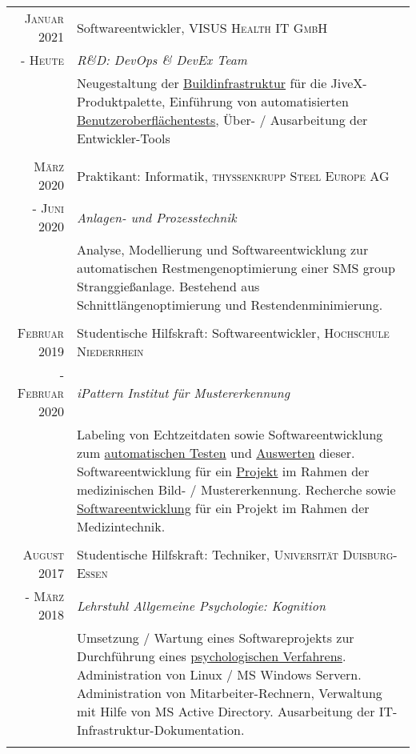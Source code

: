 \documentclass[10pt,a4paper]{article}
\begin{document}
\begin{tabular}{r|p{11cm}}
	\textsc{Januar} 2021 & Softwareentwickler, \textsc{VISUS Health IT GmbH} \\
	- \textsc{Heute} & \emph{R\&D: DevOps \& DevEx Team} \\
	& \footnotesize{Neugestaltung der \href{https://gradle.org}{Buildinfrastruktur} für die JiveX-Produktpalette, Einf\"uhrung von automatisierten \href{https://www.qfs.de}{Benutzeroberfl\"achentests}, \"Uber- / Ausarbeitung der Entwickler-Tools} \\
	\multicolumn{2}{c}{} \\
	
	\textsc{M\"arz} 2020 & Praktikant: Informatik, \textsc{thyssenkrupp Steel Europe AG} \\
	- \textsc{Juni} 2020 & \emph{Anlagen- und Prozesstechnik} \\
	& \footnotesize{Analyse, Modellierung und Softwareentwicklung zur automatischen Restmengenoptimierung einer SMS group Stranggie\ss anlage. Bestehend aus Schnittl\"angenoptimierung und Restendenminimierung.} \\
	\multicolumn{2}{c}{} \\

 	\textsc{Februar} 2019	& Studentische Hilfskraft: Softwareentwickler, \textsc{Hochschule Niederrhein} \\
	- \textsc{Februar} 2020	& \emph{iPattern Institut f\"ur Mustererkennung} \\
	& \footnotesize{Labeling von Echtzeitdaten sowie Softwareentwicklung zum \href{https://github.com/thahnen/labelbox-export-minifier}{automatischen Testen} und \href{https://github.com/thahnen/labelbox-scripts-etc}{Auswerten} dieser. Softwareentwicklung f\"ur ein \href{https://www.hs-niederrhein.de/ipattern/nachrichten-detailseite/?tx_news_pi1\%5Bnews\%5D=9545\&cHash=3202e26ca1ce23d3b3231df1f5c5a573}{Projekt} im Rahmen der medizinischen Bild- / Mustererkennung. Recherche sowie \href{https://github.com/thahnen/elastix-scripts-etc}{Softwareentwicklung} f\"ur ein Projekt im Rahmen der Medizintechnik.} \\
	\multicolumn{2}{c}{} \\
	
	 \textsc{August} 2017	& Studentische Hilfskraft: Techniker, \textsc{Universit\"at Duisburg-Essen} \\
	 - \textsc{M\"arz} 2018	& \emph{Lehrstuhl Allgemeine Psychologie: Kognition} \\
	 & \footnotesize{Umsetzung / Wartung eines Softwareprojekts zur Durchf\"uhrung eines \href{https://gdt.allgpsy.uni-due.de}{psychologischen Verfahrens}. Administration von Linux / MS Windows Servern. Administration von Mitarbeiter-Rechnern, Verwaltung mit Hilfe von MS Active Directory. Ausarbeitung der IT-Infrastruktur-Dokumentation.} \\
	 \multicolumn{2}{c}{} \\
\end{tabular} \\
\end{document}
